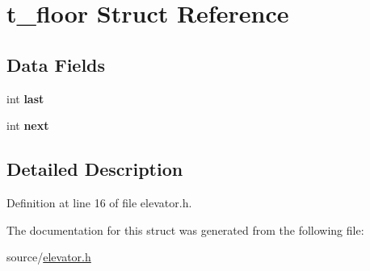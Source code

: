 \hypertarget{structt__floor}{}\section{t\+\_\+floor Struct Reference}
\label{structt__floor}
\subsection*{Data Fields}
\begin{DoxyCompactItemize}
\item 
int {\bfseries last}\hypertarget{structt__floor_ac7106a034da33a30e4bbac53b7ae9883}{}\label{structt__floor_ac7106a034da33a30e4bbac53b7ae9883}

\item 
int {\bfseries next}\hypertarget{structt__floor_af5f488e9cfc49388b0b2c58d31ef50ee}{}\label{structt__floor_af5f488e9cfc49388b0b2c58d31ef50ee}

\end{DoxyCompactItemize}


\subsection{Detailed Description}


Definition at line 16 of file elevator.\+h.



The documentation for this struct was generated from the following file\+:\begin{DoxyCompactItemize}
\item 
source/\hyperlink{elevator_8h}{elevator.\+h}\end{DoxyCompactItemize}
